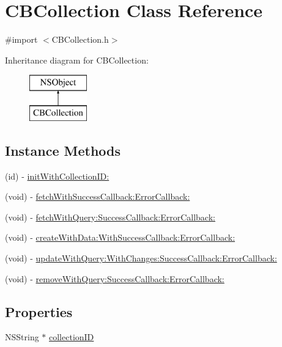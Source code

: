 \hypertarget{interface_c_b_collection}{\section{C\-B\-Collection Class Reference}
\label{interface_c_b_collection}
}


{\ttfamily \#import $<$C\-B\-Collection.\-h$>$}

Inheritance diagram for C\-B\-Collection\-:\begin{figure}[H]
\begin{center}
\leavevmode
\includegraphics[height=2.000000cm]{interface_c_b_collection}
\end{center}
\end{figure}
\subsection*{Instance Methods}
\begin{DoxyCompactItemize}
\item 
(id) -\/ \hyperlink{interface_c_b_collection_ad232890eefe5c505991479ac6f018f9a}{init\-With\-Collection\-I\-D\-:}
\item 
(void) -\/ \hyperlink{interface_c_b_collection_a9fdaad4ec27dec86a1b6ff5af2583f0d}{fetch\-With\-Success\-Callback\-:\-Error\-Callback\-:}
\item 
(void) -\/ \hyperlink{interface_c_b_collection_afa23ffb4db085f37b6821160e455a2fb}{fetch\-With\-Query\-:\-Success\-Callback\-:\-Error\-Callback\-:}
\item 
(void) -\/ \hyperlink{interface_c_b_collection_a393aef7a45fd8018d3ac32ced65a0fe7}{create\-With\-Data\-:\-With\-Success\-Callback\-:\-Error\-Callback\-:}
\item 
(void) -\/ \hyperlink{interface_c_b_collection_a0d233e2e398223d991aa0667f2249594}{update\-With\-Query\-:\-With\-Changes\-:\-Success\-Callback\-:\-Error\-Callback\-:}
\item 
(void) -\/ \hyperlink{interface_c_b_collection_abace3dfeee95833dfca05e9040426372}{remove\-With\-Query\-:\-Success\-Callback\-:\-Error\-Callback\-:}
\end{DoxyCompactItemize}
\subsection*{Properties}
\begin{DoxyCompactItemize}
\item 
N\-S\-String $\ast$ \hyperlink{interface_c_b_collection_a526d5990ac9db1922300bc55bc764fc1}{collection\-I\-D}
\end{DoxyCompactItemize}


